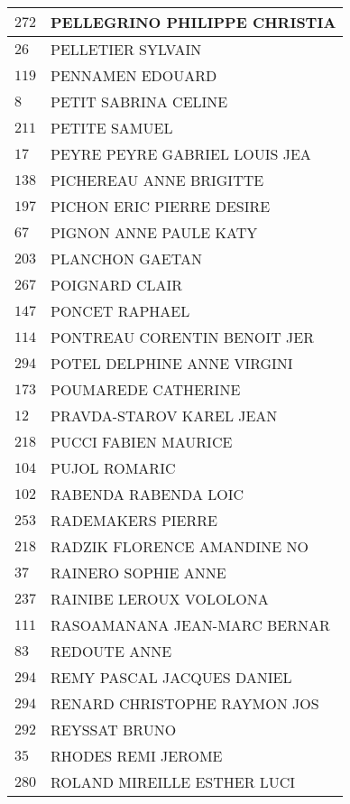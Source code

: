 \begin{xltabular}{\linewidth}{|l|X|}
    \hline
    $272$ & PELLEGRINO PHILIPPE CHRISTIA \\
    \hline
    $26$ & PELLETIER SYLVAIN \\
    \hline
    $119$ & PENNAMEN EDOUARD \\
    \hline
    $8$ & PETIT SABRINA CELINE \\
    \hline
    $211$ & PETITE SAMUEL \\
    \hline
    $17$ & PEYRE PEYRE GABRIEL LOUIS JEA \\
    \hline
    $138$ & PICHEREAU ANNE BRIGITTE \\
    \hline
    $197$ & PICHON ERIC PIERRE DESIRE \\
    \hline
    $67$ & PIGNON ANNE PAULE KATY \\
    \hline
    $203$ & PLANCHON GAETAN \\
    \hline
    $267$ & POIGNARD CLAIR \\
    \hline
    $147$ & PONCET RAPHAEL \\
    \hline
    $114$ & PONTREAU CORENTIN BENOIT JER \\
    \hline
    $294$ & POTEL DELPHINE ANNE VIRGINI \\
    \hline
    $173$ & POUMAREDE CATHERINE \\
    \hline
    $12$ & PRAVDA-STAROV KAREL JEAN \\
    \hline
    $218$ & PUCCI FABIEN MAURICE \\
    \hline
    $104$ & PUJOL ROMARIC \\
    \hline
    $102$ & RABENDA RABENDA LOIC \\
    \hline
    $253$ & RADEMAKERS PIERRE \\
    \hline
    $218$ & RADZIK FLORENCE AMANDINE NO \\
    \hline
    $37$ & RAINERO SOPHIE ANNE \\
    \hline
    $237$ & RAINIBE LEROUX VOLOLONA \\
    \hline
    $111$ & RASOAMANANA JEAN-MARC BERNAR \\
    \hline
    $83$ & REDOUTE ANNE \\
    \hline
    $294$ & REMY PASCAL JACQUES DANIEL \\
    \hline
    $294$ & RENARD CHRISTOPHE RAYMON JOS \\
    \hline
    $292$ & REYSSAT BRUNO \\
    \hline
    $35$ & RHODES REMI JEROME \\
    \hline
    $280$ & ROLAND MIREILLE ESTHER LUCI \\

\end{xltabular}
